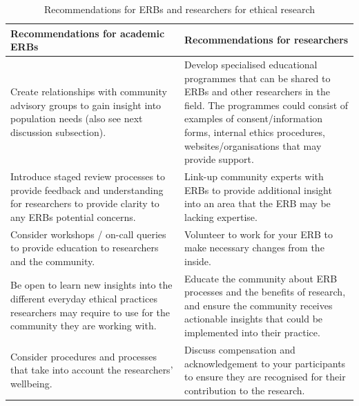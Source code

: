 \begin{table}[ht]
\renewcommand{\arraystretch}{1.7}
\centering
\begin{tabular}{p{0.5\linewidth} | p{0.5\linewidth}}
\textbf{Recommendations for academic ERBs} &
  \textbf{Recommendations for researchers} \\ \hline
Create relationships with community advisory groups to gain insight into population needs (also see next discussion subsection). &
  Develop specialised educational programmes that can be shared to ERBs and other researchers in the field. The programmes could consist of examples of consent/information forms, internal ethics procedures, websites/organisations that may provide support. \\ \hline
Introduce staged review processes to provide feedback and understanding for researchers to provide clarity to any ERBs potential concerns. &
Link-up community experts with ERBs to provide additional insight into an area that the ERB may be lacking expertise. \\ \hline
Consider workshops / on-call queries to provide education to researchers and the community. &
Volunteer to work for your ERB to make necessary changes from the inside. \\ \hline
Be open to learn new insights into the different everyday ethical practices researchers may require to use for the community they are working with. &
Educate the community about ERB processes and the benefits of research, and ensure the community receives actionable insights that could be implemented into their practice. \\ \hline
Consider procedures and processes that take into account the researchers' wellbeing. &
  Discuss compensation and acknowledgement to your participants to ensure they are recognised for their contribution to the research. \\ \hline
\end{tabular}
\caption{Recommendations for ERBs and researchers for ethical research}
\label{tab:ethicRecommendations}
\end{table}



